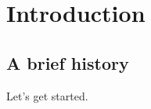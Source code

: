 \chapter{Introduction}
\label{chapter:Introduction}
\thispagestyle{myheadings}

\section{A brief history}
\label{sec:history}

Let's get started. \cite{Mountain2013Effects}
